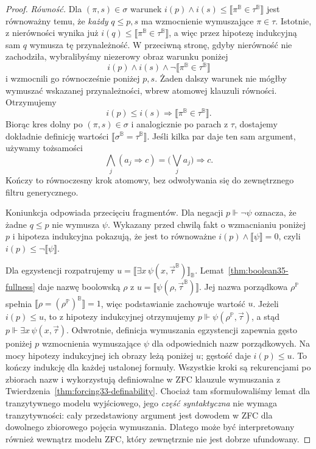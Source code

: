 \begin{proof}
\emph{Równość.}
Dla $(\pi,s)\in\sigma$ warunek
$i(p)\wedge i(s)\le
 \llbracket\pi^{\mathbb B}
             \in\tau^{\mathbb B}\rrbracket$
jest równoważny temu, że
\emph{każdy} $q\le p,s$
ma wzmocnienie wymuszające
$\pi\in\tau$. Istotnie,
z nierówności wynika już
$i(q)\le\llbracket
\pi^{\mathbb B}\in\tau^{\mathbb B}
\rrbracket$, a więc przez
hipotezę indukcyjną sam $q$
wymusza tę przynależność.
W przeciwną stronę, gdyby
nierówność nie zachodziła,
wybralibyśmy niezerowy obraz
warunku poniżej
\[
 i(p)\wedge i(s)\wedge
 \neg\llbracket
   \pi^{\mathbb B}\in\tau^{\mathbb B}
 \rrbracket
\]
i wzmocnili go równocześnie
poniżej $p,s$. Żaden dalszy
warunek nie mógłby wymuszać
wskazanej przynależności,
wbrew atomowej klauzuli
równości. Otrzymujemy
\[
 i(p)\le
 i(s)\Rightarrow
 \llbracket\pi^{\mathbb B}
             \in\tau^{\mathbb B}
 \rrbracket.
\]
Biorąc kres dolny po
$(\pi,s)\in\sigma$ i analogicznie
po parach z $\tau$, dostajemy
dokładnie definicję wartości
$\llbracket\sigma^{\mathbb B}
            =\tau^{\mathbb B}\rrbracket$.
Jeśli kilka par daje ten sam
argument, używamy tożsamości
\[
 \bigwedge_j(a_j\Rightarrow c)
 =\bigl(\bigvee_j a_j\bigr)\Rightarrow c.
\]
Kończy to równoczesny krok
atomowy, bez odwoływania się
do zewnętrznego filtru
generycznego.

Koniunkcja odpowiada
przecięciu fragmentów.
Dla negacji
$p\Vdash\neg\psi$ oznacza,
że żadne $q\le p$ nie wymusza
$\psi$. Wykazany przed chwilą
fakt o wzmacnianiu poniżej $p$
i hipoteza indukcyjna pokazują,
że jest to równoważne
$i(p)\wedge\llbracket\psi\rrbracket=0$,
czyli
$i(p)\le\neg\llbracket\psi\rrbracket$.

Dla egzystencji rozpatrujemy
$u=\llbracket\exists x\,
\psi(x,\vec\tau^{\mathbb B})
\rrbracket_{\mathbb B}$.
Lemat~\ref{thm:boolean35-fullness}
daje nazwę boolowską $\rho$
z
$u=\llbracket\psi(\rho,
\vec\tau^{\mathbb B})\rrbracket$.
Jej nazwa porządkowa
$\rho^{\mathbb P}$ spełnia
$\llbracket\rho=
(\rho^{\mathbb P})^{\mathbb B}
\rrbracket=1$, więc
podstawianie zachowuje wartość
$u$. Jeżeli $i(p)\le u$,
to z hipotezy indukcyjnej
otrzymujemy
$p\Vdash\psi(\rho^{\mathbb P},
\vec\tau)$, a stąd
$p\Vdash\exists x\,\psi(x,\vec\tau)$.
Odwrotnie, definicja
wymuszania egzystencji
zapewnia gęsto poniżej $p$
wzmocnienia wymuszające
$\psi$ dla odpowiednich
nazw porządkowych. Na mocy
hipotezy indukcyjnej ich
obrazy leżą poniżej $u$;
gęstość daje $i(p)\le u$.
To kończy indukcję dla
każdej ustalonej formuły.
Wszystkie kroki są
rekurencjami po zbiorach nazw
i wykorzystują definiowalne
w ZFC klauzule wymuszania z
Twierdzenia~\ref{thm:forcing33-definability}.
Chociaż tam sformułowaliśmy
lemat dla tranzytywnego
modelu wyjściowego, jego
\emph{część syntaktyczna}
nie wymaga tranzytywności:
cały przedstawiony argument
jest dowodem w ZFC dla
dowolnego zbiorowego pojęcia
wymuszania. Dlatego może
być interpretowany również
wewnątrz modelu ZFC,
który zewnętrznie nie jest
dobrze ufundowany.


\end{proof}
